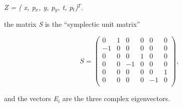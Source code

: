 \textit{Z = ( x, p$_x$, y, p$_y$, t, p$_t$)$^T$}. 

the matrix \textit{S} is the ``symplectic unit matrix'' 


\[
S =
 \begin{pmatrix}
  0 & 1 & 0 & 0 & 0 & 0 \\
  -1 & 0 & 0 & 0 & 0 & 0 \\
  0 & 0 & 0 & 1 & 0 & 0 \\
  0 & 0 & -1 & 0 & 0 & 0 \\
  0 & 0 & 0 & 0 & 0 & 1 \\
  0 & 0 & 0 & 0 & -1 & 0 \\
 \end{pmatrix}
,
\]

and the vectors \textit{E$_i$} are the three complex eigenvectors. 

